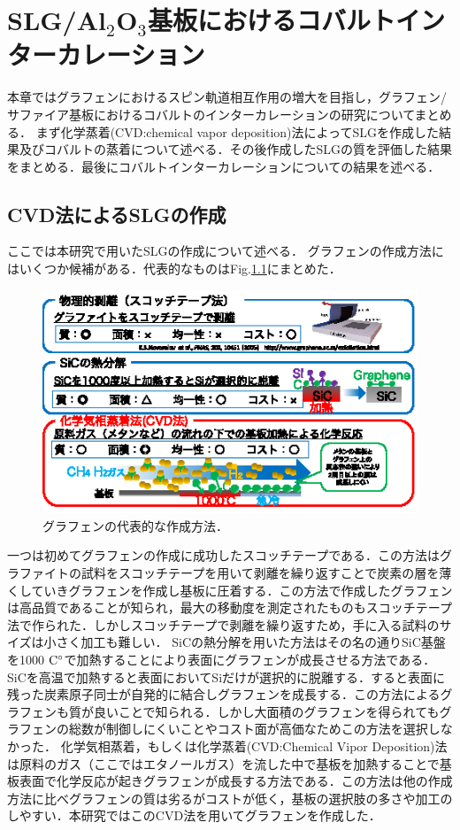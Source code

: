 \chapter{SLG/Al$_{2}$O$_{3}$基板におけるコバルトインターカレーション}

本章ではグラフェンにおけるスピン軌道相互作用の増大を目指し，グラフェン/サファイア基板におけるコバルトのインターカレーションの研究についてまとめる．
まず化学蒸着(CVD:chemical vapor deposition)法によってSLGを作成した結果及びコバルトの蒸着について述べる．その後作成したSLGの質を評価した結果をまとめる．最後にコバルトインターカレーションについての結果を述べる．

\section{CVD法によるSLGの作成}
ここでは本研究で用いたSLGの作成について述べる．
グラフェンの作成方法にはいくつか候補がある．代表的なものはFig.\ref{fig:graphene_howtomake}にまとめた．

\begin{figure}[t]
 \begin{center}
  \includegraphics[width=120mm]{images/graphene_howtomake.eps}
  \end{center}
   \caption{グラフェンの代表的な作成方法．}
 \label{fig:graphene_howtomake}
\end{figure}


一つは初めてグラフェンの作成に成功したスコッチテープである．この方法はグラファイトの試料をスコッチテープを用いて剥離を繰り返すことで炭素の層を薄くしていきグラフェンを作成し基板に圧着する．この方法で作成したグラフェンは高品質であることが知られ，最大の移動度を測定されたものもスコッチテープ法で作られた．しかしスコッチテープで剥離を繰り返すため，手に入る試料のサイズは小さく加工も難しい．
SiCの熱分解を用いた方法はその名の通りSiC基盤を1000$\rm\ C^{\circ}$で加熱することにより表面にグラフェンが成長させる方法である．SiCを高温で加熱すると表面においてSiだけが選択的に脱離する．すると表面に残った炭素原子同士が自発的に結合しグラフェンを成長する．この方法によるグラフェンも質が良いことで知られる．しかし大面積のグラフェンを得られてもグラフェンの総数が制御しにくいことやコスト面が高価なためこの方法を選択しなかった．
化学気相蒸着，もしくは化学蒸着(CVD:Chemical Vipor Deposition)法は原料のガス（ここではエタノールガス）を流した中で基板を加熱することで基板表面で化学反応が起きグラフェンが成長する方法である．この方法は他の作成方法に比べグラフェンの質は劣るがコストが低く，基板の選択肢の多さや加工のしやすい．本研究ではこのCVD法を用いてグラフェンを作成した．




